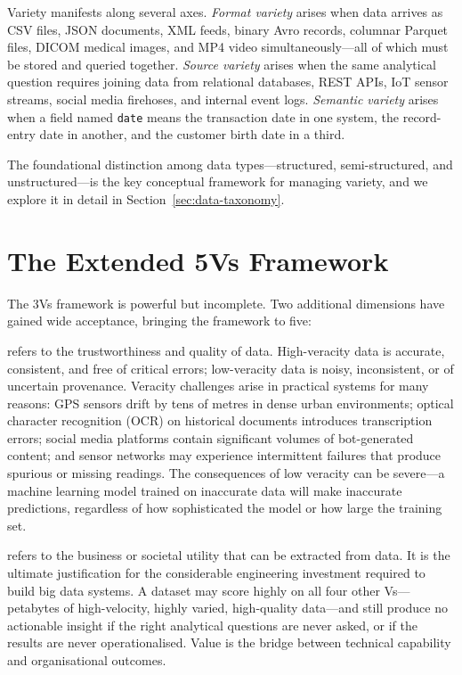 Variety manifests along several axes. \emph{Format variety} arises when
data arrives as CSV files, JSON documents, XML feeds, binary Avro
records, columnar Parquet files, DICOM medical images, and MP4 video
simultaneously---all of which must be stored and queried together.
\emph{Source variety} arises when the same analytical question requires
joining data from relational databases, REST APIs, IoT sensor streams,
social media firehoses, and internal event logs. \emph{Semantic variety}
arises when a field named \texttt{date} means the transaction date in
one system, the record-entry date in another, and the customer birth
date in a third.

The foundational distinction among data types---structured,
semi-structured, and unstructured---is the key conceptual framework for
managing variety, and we explore it in detail in
Section~\ref{sec:data-taxonomy}.



\section{The Extended 5Vs Framework}
\label{sec:five-vs}

The 3Vs framework is powerful but incomplete. Two additional dimensions
have gained wide acceptance, bringing the framework to five:

 refers to the trustworthiness and quality of data.
High-veracity data is accurate, consistent, and free of critical errors;
low-veracity data is noisy, inconsistent, or of uncertain provenance.
Veracity challenges arise in practical systems for many reasons: GPS
sensors drift by tens of metres in dense urban environments; optical
character recognition (OCR) on historical documents introduces
transcription errors; social media platforms contain significant volumes
of bot-generated content; and sensor networks may experience intermittent
failures that produce spurious or missing readings. The consequences of
low veracity can be severe---a machine learning model trained on
inaccurate data will make inaccurate predictions, regardless of how
sophisticated the model or how large the training set.

 refers to the business or societal utility that can be
extracted from data. It is the ultimate justification for the
considerable engineering investment required to build big data systems.
A dataset may score highly on all four other Vs---petabytes of
high-velocity, highly varied, high-quality data---and still produce
no actionable insight if the right analytical questions are never asked,
or if the results are never operationalised. Value is the bridge between
technical capability and organisational outcomes.



